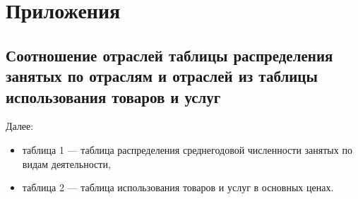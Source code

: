 \documentclass[12pt, a4paper]{article}
\begin{document}
\newpage
\section{Приложения}
\subsection{Соотношение отраслей таблицы распределения занятых по отраслям и отраслей из таблицы использования товаров и услуг}

Далее: 
\begin{itemize}\item таблица 1 --- таблица распределения среднегодовой численности занятых по видам деятельности, \item таблица 2 --- таблица использования товаров и услуг в основных ценах.\end{itemize}
\end{document}
